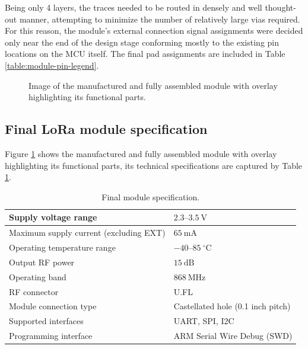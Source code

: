 Being only 4 layers, the traces needed to be routed in densely and well thought-out manner, attempting to minimize the number of relatively large vias required. For this reason, the module's external connection signal assignments were decided only near the end of the design stage conforming mostly to the existing pin locations on the MCU itself. The final pad assignments are included in Table \ref{table:module-pin-legend}.

\begin{figure}
    
    \caption{\label{fig:module-v0.1}Image of the manufactured and fully assembled module with overlay highlighting its functional parts.}
\end{figure}

\subsection{Final LoRa module specification}
Figure \ref{fig:module-v0.1} shows the manufactured and fully assembled module with overlay highlighting its functional parts, its technical specifications are captured by Table \ref{table:module-specification}.

\begin{table}[p]
\begin{center}
\caption{\label{table:module-specification}Final module specification.}
    \begin{tabular}{|l|l|} \hline
    Supply voltage range                    & $2.3\text{--}3.5~\mathrm{V}$\\ \hline
    Maximum supply current (excluding EXT)  & $65~\mathrm{mA}$\\ \hline
    Operating temperature range             & $-40\text{--}85~\mathrm{^\circ C}$\\ \hline
    Output RF power                         & $15~\mathrm{dB}$\\ \hline
    Operating band                          & $868~\mathrm{MHz}$\\ \hline
    RF connector                            & U.FL \\ \hline
    Module connection type                  & Castellated hole (0.1 inch pitch) \\ \hline
    Supported interfaces                    & UART, SPI, I2C \\ \hline
    Programming interface                   & ARM Serial Wire Debug (SWD) \\ \hline
    \end{tabular}
\end{center}
\end{table}

